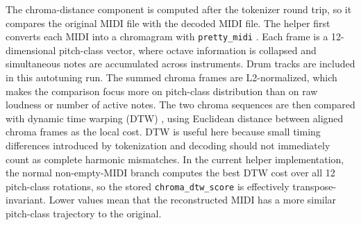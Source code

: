 The chroma-distance component is computed after the tokenizer round trip, so it compares the original MIDI file with the decoded MIDI file. The helper first converts each MIDI into a chromagram with \verb|pretty_midi| \cite{raffelINTUITIVEANALYSISCREATION}. Each frame is a 12-dimensional pitch-class vector, where octave information is collapsed and simultaneous notes are accumulated across instruments. Drum tracks are included in this autotuning run. The summed chroma frames are L2-normalized, which makes the comparison focus more on pitch-class distribution than on raw loudness or number of active notes. The two chroma sequences are then compared with dynamic time warping (DTW) \cite{giorginoComputingVisualizingDynamic2009}, using Euclidean distance between aligned chroma frames as the local cost. DTW is useful here because small timing differences introduced by tokenization and decoding should not immediately count as complete harmonic mismatches. In the current helper implementation, the normal non-empty-MIDI branch computes the best DTW cost over all 12 pitch-class rotations, so the stored \verb|chroma_dtw_score| is effectively transpose-invariant. Lower values mean that the reconstructed MIDI has a more similar pitch-class trajectory to the original.

